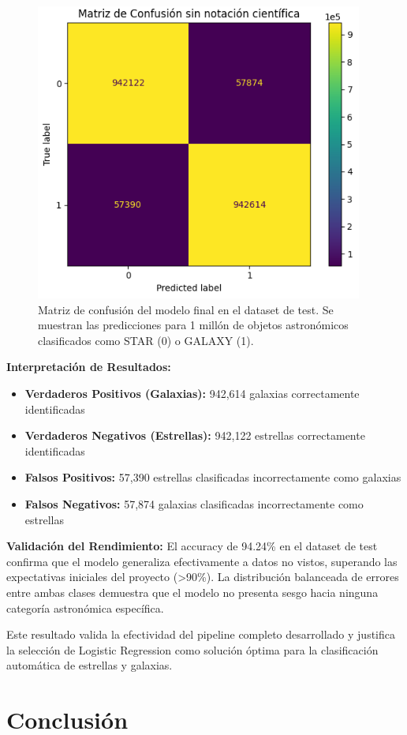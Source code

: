 \documentclass{article}
\begin{document}
\begin{figure}[H]
    \centering
    \includegraphics[width=0.6\linewidth]{matriz_confusion.png}
    \caption{Matriz de confusión del modelo final en el dataset de test. Se muestran las predicciones para 1 millón de objetos astronómicos clasificados como STAR (0) o GALAXY (1).}
    \label{fig:matriz_confusion}
\end{figure}

\textbf{Interpretación de Resultados:}
\begin{itemize}
    \item \textbf{Verdaderos Positivos (Galaxias):} 942,614 galaxias correctamente identificadas
    \item \textbf{Verdaderos Negativos (Estrellas):} 942,122 estrellas correctamente identificadas  
    \item \textbf{Falsos Positivos:} 57,390 estrellas clasificadas incorrectamente como galaxias
    \item \textbf{Falsos Negativos:} 57,874 galaxias clasificadas incorrectamente como estrellas
\end{itemize}

\textbf{Validación del Rendimiento:}
El accuracy de 94.24\% en el dataset de test confirma que el modelo generaliza efectivamente a datos no vistos, superando las expectativas iniciales del proyecto (>90\%). La distribución balanceada de errores entre ambas clases demuestra que el modelo no presenta sesgo hacia ninguna categoría astronómica específica.

Este resultado valida la efectividad del pipeline completo desarrollado y justifica la selección de Logistic Regression como solución óptima para la clasificación automática de estrellas y galaxias.

\newpage

\section{Conclusión}
\end{document}
